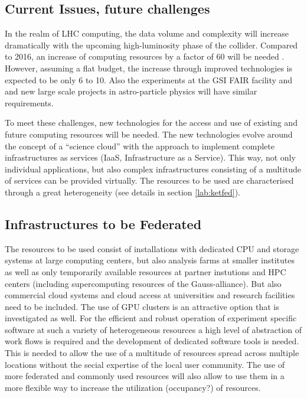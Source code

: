 \subsection{Current Issues, future challenges}
In the realm of LHC computing, the data volume and complexity will
increase dramatically with the upcoming high-luminosity phase of the
collider. Compared to 2016, an increase of computing resources by a
factor of 60 will be needed . However, assuming a flat budget, the
increase through improved technologies is expected to be only 6 to 10. Also the
experiments at the GSI FAIR facility
and and new large scale projects in astro-particle
physics will have similar requirements. 

To meet these challenges, new technologies for the access and use of
existing and future computing resources will be needed. The new
technologies evolve around the concept of a ``science cloud'' with the
approach to implement complete infrastructures as services (IaaS,
Infrastructure as a Service). This way, not only individual
applications, but also complex infrastructures consisting of a
multitude of services can be provided virtually. The resources to be
used are characterised through a great heterogeneity (see details in section
\ref{lab:ketfed}). 

\subsection{Infrastructures to be Federated \label{lab:ketfed} }
The resources to be used consist of installations with dedicated CPU
and storage systems at large computing centers, but also analysis
farms at smaller institutes as well as only temporarily available
resources at partner instutions and HPC centers (including
supercomputing resources of the Gauss-alliance). But also commercial
cloud systems and cloud access at universities and research facilities
need to be included. The use of GPU clusters is an attractive option
that is investigated as well. For the efficient and robust operation
of experiment specific software at such a variety of heterogeneous
resources a high level of abstraction of work flows is required and
the development of dedicated software tools is needed. This is needed
to allow the use of a multitude of resources spread across multiple
locations without the secial expertise of the local user
community. The use of more federated and commonly used resources will
also allow to use them in a more flexible way to increase the
utilization (occupancy?) of resources. 

